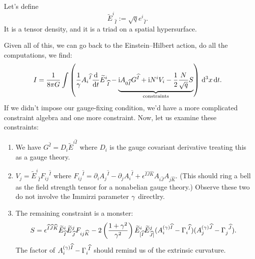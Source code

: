\begin{notation}
  Let's define
  \begin{equation}
{\widetilde{E}^{i}}_{\widehat{I}} := \sqrt{q}{e^{i}}_{\widehat{I}}.
  \end{equation}
It is a tensor density, and it is a triad on a spatial hypersurface.
\end{notation}

Given all of this, we can go back to the Einstein--Hilbert action, do
all the computations, we find:
\begin{equation}
  I = \frac{1}{8\pi G}\int\left(
  \frac{1}{\gamma}{A_{i}}^{\widehat{I}}\frac{\mathrm{d}}{\mathrm{d} t} {{\widetilde{E}}^{i}}_{\phantom{i}\widehat{I}}
-\underbrace{\mathrm{i} A_{0\widehat{I}}G^{\widehat{I}} + \mathrm{i}N^{i}V_{i} - \frac{1}{2}\frac{N}{\sqrt{q}}S}_{\text{constraints}}
  \right)\,\mathrm{d}^{3}x\,\mathrm{d} t.
\end{equation}
If we didn't impose our gauge-fixing condition, we'd have a more
complicated constraint algebra and one more constraint. Now, let us
examine these constraints:
\begin{enumerate}[nosep,label=(\arabic*)]
\item We have $G^{\widehat{I}} = D_{i}\widetilde{E}^{i\widehat{I}}$
  where $D_{i}$ is the gauge covariant derivative treating this as a
  gauge theory.
\item $V_{j} = \widetilde{E}^{i}_{\phantom{i}\widehat{I}}{F_{ij}}^{\widehat{I}}$
  where ${F_{ij}}^{\widehat{I}} = \partial_{i}{A_{j}}^{\widehat{I}} - \partial_{j}{A_{i}}^{\widehat{I}}+\epsilon^{\widehat{I}\widehat{J}\widehat{K}}A_{i\widehat{J}}A_{j\widehat{K}}$.
  (This should ring a bell as the field strength tensor for a nonabelian
  gauge theory.) Observe these two do not involve the Immirzi parameter
  $\gamma$ directlry.
\item The remaining constraint is a monster:
  \begin{equation}
S = \epsilon^{\widehat{I}\widehat{J}\widehat{K}}\widetilde{E}^{i}_{\widehat{I}}\widetilde{E}^{j}_{\widehat{J}}F_{ij\widehat{K}}
-2\left(\frac{1+\gamma^{2}}{\gamma^{2}}\right)\widetilde{E}^{i}_{[\widehat{I}}\widetilde{E}^{j}_{\widehat{J}]}(A^{(\gamma)\widehat{I}}_{i}-\Gamma_{i}^{\phantom{i}\widehat{I}})
(A^{(\gamma)\widehat{J}}_{j}-\Gamma_{j}^{\phantom{j}\widehat{J}}).
  \end{equation}
  The factor of $A^{(\gamma)\widehat{I}}_{i}-\Gamma_{i}^{\phantom{i}\widehat{I}}$
  should remind us of the extrinsic curvature.
\end{enumerate}\medbreak

